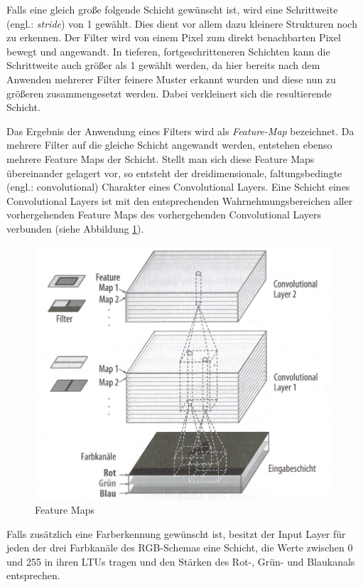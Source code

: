 Falls eine gleich große folgende Schicht gewünscht ist, wird eine Schrittweite (engl.: \textit{stride}) von 1 gewählt. Dies dient vor allem dazu kleinere Strukturen noch zu erkennen. Der Filter wird von einem Pixel zum direkt benachbarten Pixel bewegt und angewandt. In tieferen, fortgeschritteneren Schichten kann die Schrittweite auch größer als 1 gewählt werden, da hier bereits nach dem Anwenden mehrerer Filter feinere Muster erkannt wurden und diese nun zu größeren zusammengesetzt werden. Dabei verkleinert sich die resultierende Schicht. \cite[S. 362 f.]{AurelienGeron.2018}

Das Ergebnis der Anwendung eines Filters wird als \textit{Feature-Map} bezeichnet. Da mehrere Filter auf die gleiche Schicht angewandt werden, entstehen ebenso mehrere Feature Maps der Schicht. Stellt man sich diese Feature Maps übereinander gelagert vor, so entsteht der dreidimensionale, \glqq faltungsbedingte\grqq{} (engl.: convolutional) Charakter eines Convolutional Layers. Eine Schicht eines Convolutional Layers ist mit den entsprechenden Wahrnehmungsbereichen aller vorhergehenden Feature Maps des vorhergehenden Convolutional Layers verbunden (siehe Abbildung \ref{feature_maps}). \cite[S. 363 f.]{AurelienGeron.2018}

\begin{figure}[ht]
	\begin{center}
		\includegraphics[width=11cm]{Bilder/feature_maps.jpeg} 
		\caption[Feature Maps]{Feature Maps \cite{AurelienGeron.2018}}
		\label{feature_maps}
	\end{center}
\end{figure}

Falls zusätzlich eine Farberkennung gewünscht ist, besitzt der Input Layer für jeden der drei Farbkanäle des RGB-Schemas eine Schicht, die Werte zwischen 0 und 255 in ihren LTUs tragen und den Stärken des Rot-, Grün- und Blaukanals entsprechen. \cite[S. 364 f.]{AurelienGeron.2018}


